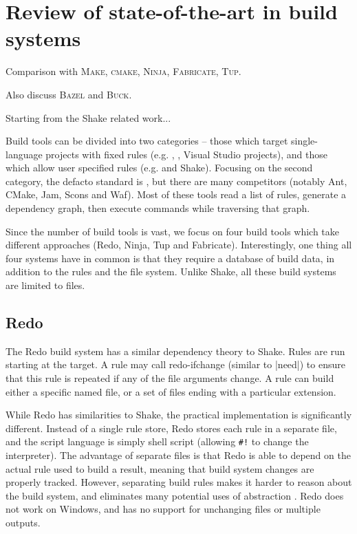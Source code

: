 \section{Review of state-of-the-art in build systems\label{section-review}}

Comparison with \textsc{Make}, \textsc{cmake}, \textsc{Ninja},
\textsc{Fabricate}, \textsc{Tup}.

Also discuss \textsc{Bazel} and \textsc{Buck}.

Starting from the Shake related work...

Build tools can be divided into two categories -- those which target single-language projects with fixed rules (e.g. , , Visual Studio projects), and those which allow user specified rules (e.g. \make{} and Shake). Focusing on the second category, the defacto standard is \make{}, but there are many \make{} competitors (notably Ant, CMake, Jam, Scons and Waf). Most of these tools read a list of rules, generate a dependency graph, then execute commands while traversing that graph.

Since the number of build tools is vast, we focus on four build tools which take different approaches (Redo, Ninja, Tup and Fabricate). Interestingly, one thing all four systems have in common is that they require a database of build data, in addition to the rules and the file system. Unlike Shake, all these build systems are limited to files.

\subsection{Redo}


The Redo build system \cite{redo} has a similar dependency theory to Shake. Rules are run starting at the target. A rule may call \textsf{redo-ifchange} (similar to |need|) to ensure that this rule is repeated if any of the file arguments change. A rule can build either a specific named file, or a set of files ending with a particular extension.

While Redo has similarities to Shake, the practical implementation is significantly different. Instead of a single rule store, Redo stores each rule in a separate file, and the script language is simply shell script (allowing \verb"#!" to change the interpreter). The advantage of separate files is that Redo is able to depend on the actual rule used to build a result, meaning that build system changes are properly tracked. However, separating build rules makes it harder to reason about the build system, and eliminates many potential uses of abstraction \cite{jonge:build_components}. Redo does not work on Windows, and has no support for unchanging files or multiple outputs.

